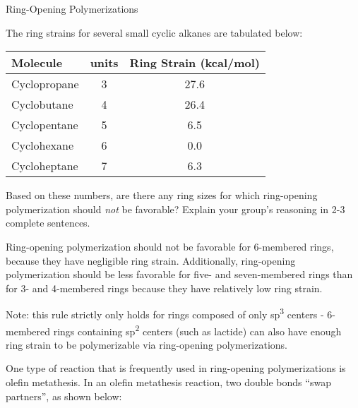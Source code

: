 \begin{activity}{Ring-Opening Polymerizations}
\begin{infobox}
	The ring strains for several small cyclic alkanes are tabulated below:
	\begin{center}
	\begin{tabular}{lcc}
		\hline		
		Molecule & \ce{CH2} units & Ring Strain (kcal/mol)\\\hline
		Cyclopropane & 3 & 27.6\\
		Cyclobutane & 4 & 26.4\\
		Cyclopentane & 5 & 6.5\\
		Cyclohexane & 6 & 0.0\\
		Cycloheptane & 7 & 6.3\\
	\end{tabular}
	\end{center}

\end{infobox}

\begin{ctqs}

	\question Based on these numbers, are there any ring sizes for which ring-opening polymerization should \emph{not} be favorable?  Explain your group's reasoning in 2-3 complete sentences. \label{\labelbase:ctq:ringsizes}
			
				\begin{solution}[2in]{}
					Ring-opening polymerization should not be favorable for 6-membered rings, because they have negligible ring strain.  Additionally, ring-opening polymerization should be less favorable for five- and seven-membered rings than for 3- and 4-membered rings because they have relatively low ring strain.
					
					Note: this rule strictly only holds for rings composed of only sp\textsuperscript{3} centers - 6-membered rings containing sp\textsuperscript{2} centers (such as lactide) can also have enough ring strain to be polymerizable via ring-opening polymerizations.
				\end{solution}

\end{ctqs}

\clearpage
\begin{model}
	\label{\labelbase:mdl:ROMP}

	One type of reaction that is frequently used in ring-opening polymerizations is olefin metathesis.
	In an olefin metathesis reaction, two double bonds ``swap partners'', as shown below:
	

\end{model}
\end{activity}
